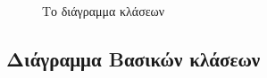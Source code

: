 \documentclass{assignment}
\begin{document}
\begin{figure}
\begin{center}
\caption{Το διάγραμμα κλάσεων}
\label{fig:class_diagramm}
\end{center}
\end{figure}

\subsection{Διάγραμμα Βασικών κλάσεων}
\end{document}
